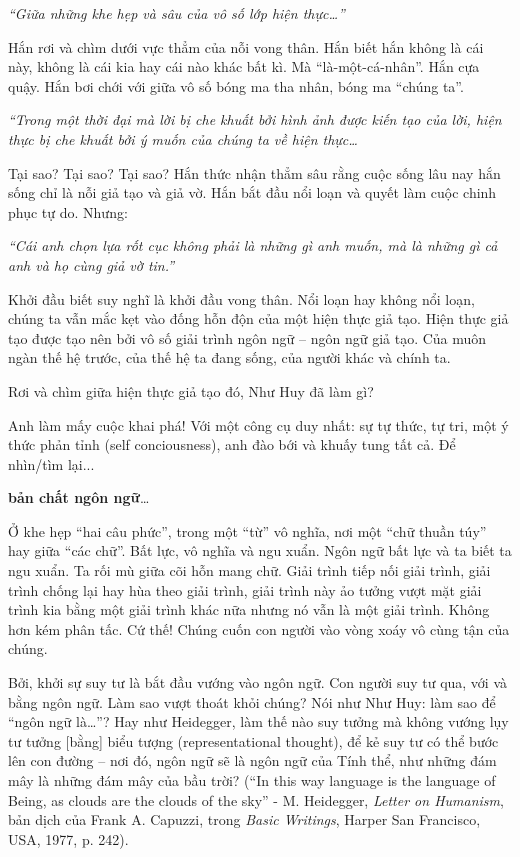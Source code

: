 \documentclass[../main.tex]{subfiles}
\begin{document}
\begin{multicols}{2}
\begin{blockquote}
\textit{“Giữa những khe hẹp và sâu của vô số lớp hiện thực…”} 

\end{blockquote}
 
Hắn rơi và chìm dưới vực thẳm của nỗi vong thân. Hắn biết hắn không là cái này, không là cái kia hay cái nào khác bất kì. Mà “là-một-cá-nhân”. Hắn cựa quậy. Hắn bơi chới với giữa vô số bóng ma tha nhân, bóng ma “chúng ta”. 
\begin{blockquote}
 
\textit{“Trong một thời đại mà lời bị che khuất bởi hình ảnh được kiến tạo của lời, hiện thực bị che khuất bởi ý muốn của chúng ta về hiện thực…} 

\end{blockquote}
 
Tại sao? Tại sao? Tại sao? Hắn thức nhận thẳm sâu rằng cuộc sống lâu nay hắn sống chỉ là nỗi giả tạo và giả vờ. Hắn bắt đầu nổi loạn và quyết làm cuộc chinh phục tự do. Nhưng:  
\begin{blockquote}
 
\textit{“Cái anh chọn lựa rốt cục không phải là những gì anh muốn, mà là những gì cả anh và họ cùng giả vờ tin.”} 

\end{blockquote}
 
Khởi đầu biết suy nghĩ là khởi đầu vong thân. Nổi loạn hay không nổi loạn, chúng ta vẫn mắc kẹt vào đống hỗn độn của một hiện thực giả tạo. Hiện thực giả tạo được tạo nên bởi vô số giải trình ngôn ngữ – ngôn ngữ giả tạo. Của muôn ngàn thế hệ trước, của thế hệ ta đang sống, của người khác và chính ta. 
 
Rơi và chìm giữa hiện thực giả tạo đó, Như Huy đã làm gì? 
 
Anh làm mấy cuộc khai phá! Với một công cụ duy nhất: sự tự thức, tự tri, một ý thức phản tỉnh (self conciousness), anh đào bới và khuấy tung tất cả. Để nhìn/tìm lại... 
 
 
\textbf{bản chất ngôn ngữ}… 
 
Ở khe hẹp “hai câu phức”, trong một “từ” vô nghĩa, nơi một “chữ thuần túy” hay giữa “các chữ”. Bất lực, vô nghĩa và ngu xuẩn. Ngôn ngữ bất lực và ta biết ta ngu xuẩn. Ta rối mù giữa cõi hỗn mang chữ. Giải trình tiếp nối giải trình, giải trình chống lại hay hùa theo giải trình, giải trình này ảo tưởng vượt mặt giải trình kia bằng một giải trình khác nữa nhưng nó vẫn là một giải trình. Không hơn kém phân tấc. Cứ thế! Chúng cuốn con người vào vòng xoáy vô cùng tận của chúng. 
 
Bởi, khởi sự suy tư là bắt đầu vướng vào ngôn ngữ. Con người suy tư qua, với và bằng ngôn ngữ. Làm sao vượt thoát khỏi chúng? Nói như Như Huy: làm sao để “ngôn ngữ là…”? Hay như Heidegger, làm thế nào suy tưởng mà không vướng lụy tư tưởng [bằng] biểu tượng (representational thought), để kẻ suy tư có thể bước lên con đường – nơi đó, ngôn ngữ sẽ là ngôn ngữ của Tính thể, như những đám mây là những đám mây của bầu trời? (“In this way language is the language of Being, as clouds are the clouds of the sky” -  M. Heidegger, \textit{Letter on Humanism}, bản dịch của Frank A. Capuzzi, trong \textit{Basic Writings}, Harper San Francisco, USA, 1977, p. 242). 
 

\end{multicols}
\end{document}
